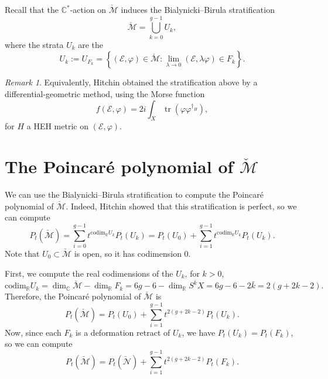 \documentclass[12pt,a4paper]{amsbook}
\theoremstyle{remark} \newtheorem{rmk}[thm]{Remark}
\theoremstyle{definition} \newtheorem{defn}[thm]{Definition}
\theoremstyle{definition} \newtheorem{ex}[thm]{Example}
\theoremstyle{definition} \newtheorem{ej}{Exercise}
\let\emph\relax
\newcommand{\C}{\mathbb C}
\newcommand{\bbR}{\mathbb R}
\newcommand{\cM}{\mathcal M}
\newcommand{\cN}{\mathcal N}
\newcommand{\sE}{\mathscr E}
\DeclareMathOperator{\tr}{tr}
\begin{document}
Recall that the $\C^*$-action on $\check{\cM}$ induces the Bialynicki--Birula stratification
\begin{equation*}
\check{\cM} = \bigcup_{k=0}^{g-1} U_k,
\end{equation*}
where the strata $U_k$ are the \emph{attractors}
\begin{equation*}
U_k := U_{F_k}= \left\{ (\sE,\varphi) \in \check{\cM}: \lim_{\lambda \rightarrow 0} (\sE,\lambda \varphi) \in F_k \right\}.
\end{equation*}

\begin{rmk}
Equivalently, Hitchin obtained the stratification above by a differential-geometric method, using the Morse function
\begin{equation*}
f(\sE,\varphi) = 2i \int_X \tr(\varphi \varphi^{\dagger_H}),
\end{equation*}
for $H$ a HEH metric on $(\sE,\varphi)$.
\end{rmk}

\section{The Poincaré polynomial of $\check{\cM}$}
We can use the Bialynicki--Birula stratification to compute the Poincaré polynomial of $\check{\cM}$. Indeed, Hitchin \cite{Hitchin_SelfDuality} showed that this stratification is perfect, so we can compute
\begin{equation*}
P_t(\check{\cM}) = \sum_{i=0}^{g-1} t^{\mathrm{codim}_{\bbR} U_k} P_t(U_k) = P_t(U_0) + \sum_{i=1}^{g-1} t^{\mathrm{codim}_{\bbR} U_k} P_t(U_k).
\end{equation*}
Note that $U_0\subset \check{\cM}$ is open, so it has codimension $0$.

First, we compute the real codimensions of the $U_k$, for $k>0$,
\begin{equation*}
\mathrm{codim}_{\bbR} U_k = \dim_{\C} \check{\cM} - \dim_{\bbR} F_k = 6g - 6 - \dim_{\bbR} S^{\bar{k}} X = 6g - 6 - 2\bar{k} = 2(g + 2k - 2) .
\end{equation*}
Therefore, the Poincaré polynomial of $\check{\cM}$ is
\begin{equation*}
P_t(\check{\cM}) = P_t(U_0) + \sum_{i=1}^{g-1} t^{2(g+2k-2)} P_t(U_k).
\end{equation*}
Now, since each $F_k$ is a deformation retract of $U_k$, we have $P_t(U_k)=P_t(F_k)$, so we can compute
\begin{equation} \label{eq:poincM}
P_t(\check{\cM}) = P_t(\check{\cN}) + \sum_{i=1}^{g-1} t^{2(g+2k-2)} P_t(F_k).
\end{equation}
\end{document}
